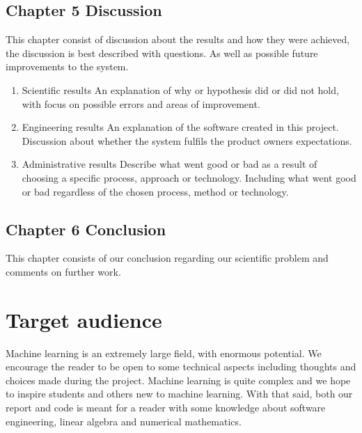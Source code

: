 \subsection{Chapter 5 Discussion}
This chapter consist of discussion about the results and how they were achieved, the discussion is best described with questions. 
As well as possible future improvements to the system.



\begin{enumerate}
    \item Scientific results
    An explanation of why or hypothesis did or did not hold, with focus on possible errors and areas of improvement.
    
    \item Engineering results
    An explanation of the software created in this project. Discussion about whether the system fulfils the product owners expectations.
    
    \item Administrative results
    Describe what went good or bad as a result of choosing a specific process, approach or technology. Including what went good or bad regardless of the chosen process, method or technology.
    
\end{enumerate}

\subsection{Chapter 6 Conclusion}
This chapter consists of our conclusion regarding our scientific problem and comments on further work.


\section{Target audience}
Machine learning is an extremely large field, with enormous potential. We encourage the reader to be open to some technical aspects including thoughts and choices made during the project. Machine learning is quite complex and we hope to inspire students and others new to machine learning. With that said, both our report and code is meant for a reader with some knowledge about software engineering, linear algebra and numerical mathematics. 

